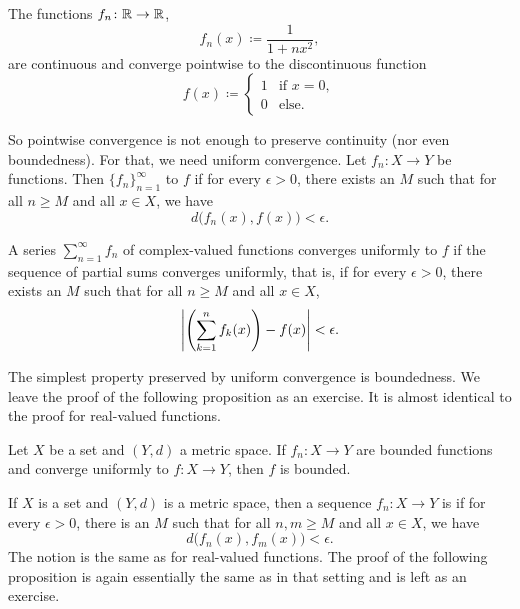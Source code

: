 \begin{example}
The functions $f_n \colon {\mathbb{R}} \to {\mathbb{R}}$,
\begin{equation*}
f_n(x) \coloneqq \frac{1}{1+nx^2},
\end{equation*}
are continuous and converge pointwise to the discontinuous function
\begin{equation*}
f(x) \coloneqq 
\begin{cases}
1 & \text{if } x=0, \\
0 & \text{else.}
\end{cases}
\end{equation*}
\end{example}

So pointwise convergence is not enough to preserve continuity (nor even
boundedness).  For that, we need uniform convergence.
Let $f_n \colon X \to Y$ be functions.  Then
$\{f_n\}_{n=1}^\infty$ \emph{}
to $f$ if
for every $\epsilon > 0$, there exists an $M$ such that
for all $n \geq M$ and all $x \in X$, we have
\begin{equation*}
d\bigl(f_n(x),f(x)\bigr) < \epsilon .
\end{equation*}

A series $\sum_{n=1}^\infty f_n$ of complex-valued functions converges uniformly
to $f$ if the sequence of
partial sums converges uniformly, that is, if for every $\epsilon > 0$,
there exists an $M$ such that
for all $n \geq M$ and all $x \in X$,
\begin{equation*}
\left\lvert {\left(\sum_{k=1}^n f_k(x)\right)-f(x)} \right\rvert < \epsilon .
\end{equation*}

The simplest property preserved by uniform convergence is
boundedness.  We leave the proof of the following proposition as an
exercise.  It is almost identical to the proof for real-valued functions.

\begin{prop} \label{prop:uniformconvbounded}
Let $X$ be a set and $(Y,d)$ a metric space.
If $f_n \colon X \to Y$ are bounded functions and converge uniformly to $f
\colon X \to Y$, then $f$ is bounded.
\end{prop}

If $X$ is a set and $(Y,d)$ is a metric space, then a sequence $f_n \colon X
\to Y$ is \emph{} if for every $\epsilon > 0$, there is an $M$ such that
for all $n, m \geq M$ and all $x \in X$, we have
\begin{equation*}
d\bigl(f_n(x),f_m(x)\bigr) < \epsilon .
\end{equation*}
The notion is the same as for real-valued functions.
The proof of the following proposition is
again essentially the same as in that setting and
is left as an exercise.

